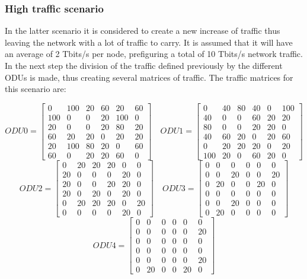 \subsubsection{High traffic scenario}\label{high_traffic_scenario}

In the latter scenario it is considered to create a new increase of traffic thus leaving the network with a lot of traffic to carry. It is assumed that it will have an average of 2 Tbits/s per node, prefiguring a total of 10 Tbits/s network traffic.
In the next step the division of the traffic defined previously by the different ODUs is made, thus creating several matrices of traffic.
The traffic matrices for this scenario are:

\[
ODU0=
  \begin{bmatrix}
    0 & 100 & 20 & 60 & 20 & 60 \\
    100 & 0 & 0 & 20 & 100 & 0 \\
    20 & 0 & 0 & 20 & 80 & 20 \\
    60 & 20 & 20 & 0 & 20 & 20 \\
    20 & 100 & 80 & 20 & 0 & 60 \\
    60 & 0 & 20 & 20 & 60 & 0
  \end{bmatrix}
\quad ODU1=
  \begin{bmatrix}
    0 & 40 & 80 & 40 & 0 & 100 \\
    40 & 0 & 0 & 60 & 20 & 20 \\
    80 & 0 & 0 & 20 & 20 & 0 \\
    40 & 60 & 20 & 0 & 20 & 60 \\
    0 & 20 & 20 & 20 & 0 & 20 \\
    100 & 20 & 0 & 60 & 20 & 0
  \end{bmatrix}
\]
\[
ODU2=
  \begin{bmatrix}
    0 & 20 & 20 & 20 & 0 & 0 \\
    20 & 0 & 0 & 0 & 20 & 0 \\
    20 & 0 & 0 & 20 & 20 & 0 \\
    20 & 0 & 20 & 0 & 20 & 0 \\
    0 & 20 & 20 & 20 & 0 & 20 \\
    0 & 0 & 0 & 0 & 20 & 0
  \end{bmatrix}
\quad ODU3=
  \begin{bmatrix}
    0 & 0 & 0 & 0 & 0 & 0 \\
    0 & 0 & 20 & 0 & 0 & 20 \\
    0 & 20 & 0 & 0 & 20 & 0 \\
    0 & 0 & 0 & 0 & 0 & 0 \\
    0 & 0 & 20 & 0 & 0 & 0 \\
    0 & 20 & 0 & 0 & 0 & 0
  \end{bmatrix}
\]
\[
ODU4=
  \begin{bmatrix}
    0 & 0 & 0 & 0 & 0 & 0 \\
    0 & 0 & 0 & 0 & 0 & 20 \\
    0 & 0 & 0 & 0 & 0 & 0 \\
    0 & 0 & 0 & 0 & 0 & 0 \\
    0 & 0 & 0 & 0 & 0 & 20 \\
    0 & 20 & 0 & 0 & 20 & 0
  \end{bmatrix}
\]

